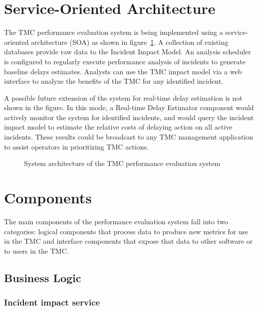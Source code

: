 \documentclass[12pt]{report}
\newcommand{\inputTikZ}[1]{%
  }
\newcommand{\inputTikZ}[1]{%
    \beginpgfgraphicnamed{#1-external}%
    \endpgfgraphicnamed%
  }
\begin{document}
\section{Service-Oriented Architecture}
\label{sec:soa}

The TMC performance evaluation system is being implemented using a
service-oriented architecture (SOA) as shown in
figure~\ref{fig:system-arch}. A collection of existing databases
provide raw data to the Incident Impact Model.  An analysis scheduler
is configured to regularly execute performance analysis of incidents
to generate baseline delays estimates.  Analysts can use the TMC
impact model via a web interface to analyze the benefits of the TMC
for any identified incident.

A possible future extension of the system for real-time delay
estimation is not shown in the figure. In this mode, a Real-time Delay
Estimator component would actively monitor the system for identified
incidents, and would query the incident impact model to estimate the
relative costs of delaying action on all active incidents. These
results could be broadcast to any TMC management application to assist
operators in prioritizing TMC actions.  

\begin{figure}[htbp]
  \begin{center}
    \inputTikZ{figs/status}
    \caption{System architecture of the TMC performance evaluation
      system}
    \label{fig:system-arch}
  \end{center}
\end{figure}

\section{Components}
\label{sec:components}

The main components of the performance evaluation system fall into two
categories: logical components that process data to produce new
metrics for use in the TMC and interface components that expose that
data to other software or to users in the TMC.

\subsection{Business Logic}
\label{sec:logic}

\subsubsection{Incident impact service}
\end{document}
